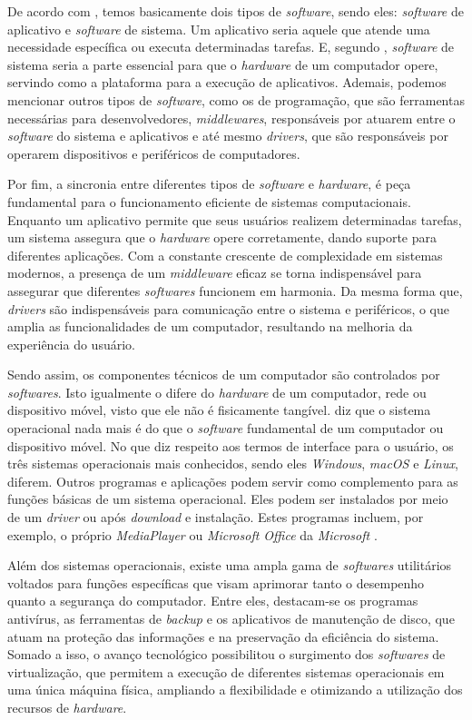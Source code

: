 \documentclass[english,brazilian]{UNISINOSartigo} %
\begin{document}
De acordo com , temos basicamente dois tipos de \textit{software}, sendo eles: \textit{software} de aplicativo e \textit{software} de sistema. Um aplicativo seria aquele que atende uma necessidade específica ou executa determinadas tarefas. E, segundo , \textit{software} de sistema seria a parte essencial para que o \textit{hardware} de um computador opere, servindo como a plataforma para a execução de aplicativos. Ademais, podemos mencionar outros tipos de \textit{software}, como os de programação, que são ferramentas necessárias para desenvolvedores, \textit{middlewares}, responsáveis por atuarem entre o \textit{software} do sistema e aplicativos e até mesmo \textit{drivers}, que são responsáveis por operarem dispositivos e periféricos de computadores.

Por fim, a sincronia entre diferentes tipos de \textit{software} e \textit{hardware}, é peça fundamental para o funcionamento eficiente de sistemas computacionais. Enquanto um aplicativo permite que seus usuários realizem determinadas tarefas, um sistema assegura que o \textit{hardware} opere corretamente, dando suporte para diferentes aplicações. Com a constante crescente de complexidade em sistemas modernos, a presença de um \textit{middleware} eficaz se torna indispensável para assegurar que diferentes \textit{softwares} funcionem em harmonia. Da mesma forma que, \textit{drivers} são indispensáveis para comunicação entre o sistema e periféricos, o que amplia as funcionalidades de um computador, resultando na melhoria da experiência do usuário.

Sendo assim, os componentes técnicos de um computador são controlados por \textit{softwares}. Isto igualmente o difere do \textit{hardware} de um computador, rede ou dispositivo móvel, visto que ele não é fisicamente tangível.  diz que o sistema operacional nada mais é do que o \textit{software} fundamental de um computador ou dispositivo móvel. No que diz respeito aos termos de interface para o usuário, os três sistemas operacionais mais conhecidos, sendo eles \textit{Windows}, \textit{macOS} e \textit{Linux}, diferem. Outros programas e aplicações podem servir como complemento para as funções básicas de um sistema operacional. Eles podem ser instalados por meio de um \textit{driver} ou após \textit{download} e instalação. Estes programas incluem, por exemplo, o próprio \textit{MediaPlayer} ou \textit{Microsoft Office} da \textit{Microsoft} \cite{neto2019}.

Além dos sistemas operacionais, existe uma ampla gama de \textit{softwares} utilitários voltados para funções específicas que visam aprimorar tanto o desempenho quanto a segurança do computador. Entre eles, destacam-se os programas antivírus, as ferramentas de \textit{backup} e os aplicativos de manutenção de disco, que atuam na proteção das informações e na preservação da eficiência do sistema. Somado a isso, o avanço tecnológico possibilitou o surgimento dos \textit{softwares} de virtualização, que permitem a execução de diferentes sistemas operacionais em uma única máquina física, ampliando a flexibilidade e otimizando a utilização dos recursos de \textit{hardware}.
\end{document}
